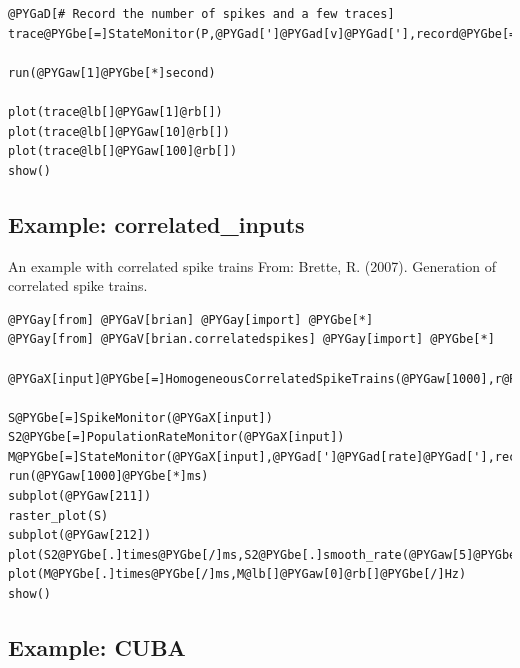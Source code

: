 \documentclass[letterpaper,10pt]{manual}
\begin{document}
\begin{Verbatim}[commandchars=@\[\]]
@PYGaD[# Record the number of spikes and a few traces]
trace@PYGbe[=]StateMonitor(P,@PYGad[']@PYGad[v]@PYGad['],record@PYGbe[=]@lb[]@PYGaw[1],@PYGaw[10],@PYGaw[100]@rb[])

run(@PYGaw[1]@PYGbe[*]second)

plot(trace@lb[]@PYGaw[1]@rb[])
plot(trace@lb[]@PYGaw[10]@rb[])
plot(trace@lb[]@PYGaw[100]@rb[])
show()
\end{Verbatim}

\resetcurrentobjects
{}

\hypertarget{index-30}{}\subsection{Example: correlated\_inputs}

An example with correlated spike trains
From: Brette, R. (2007). Generation of correlated spike trains.

\begin{Verbatim}[commandchars=@\[\]]
@PYGay[from] @PYGaV[brian] @PYGay[import] @PYGbe[*]
@PYGay[from] @PYGaV[brian.correlatedspikes] @PYGay[import] @PYGbe[*]

@PYGaX[input]@PYGbe[=]HomogeneousCorrelatedSpikeTrains(@PYGaw[1000],r@PYGbe[=]@PYGaw[30]@PYGbe[*]Hz,c@PYGbe[=]@PYGaw[0.05],tauc@PYGbe[=]@PYGaw[10]@PYGbe[*]ms)

S@PYGbe[=]SpikeMonitor(@PYGaX[input])
S2@PYGbe[=]PopulationRateMonitor(@PYGaX[input])
M@PYGbe[=]StateMonitor(@PYGaX[input],@PYGad[']@PYGad[rate]@PYGad['],record@PYGbe[=]@PYGaA[True])
run(@PYGaw[1000]@PYGbe[*]ms)
subplot(@PYGaw[211])
raster_plot(S)
subplot(@PYGaw[212])
plot(S2@PYGbe[.]times@PYGbe[/]ms,S2@PYGbe[.]smooth_rate(@PYGaw[5]@PYGbe[*]ms))
plot(M@PYGbe[.]times@PYGbe[/]ms,M@lb[]@PYGaw[0]@rb[]@PYGbe[/]Hz)
show()
\end{Verbatim}

\resetcurrentobjects
{}

\hypertarget{index-21}{}\subsection{Example: CUBA}
\end{document}
